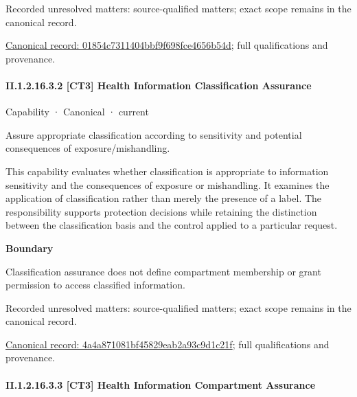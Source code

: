 {\small Recorded unresolved matters: source-qualified matters; exact scope remains in the canonical record.}\par
{\footnotesize \href{../../../../continuum/strategy/capability/01854c7311404bbf9f698fce4656b54d.md}{Canonical record: 01854c7311404bbf9f698fce4656b54d}; full qualifications and provenance.}\par
\paragraph*{II.1.2.16.3.2 [CT3] Health Information Classification Assurance}
\label{navigation:II.1.2.16.3.2}

\label{element:4a4a871081bf45829eab2a93c9d1c21f}
{\small Capability · Canonical · current}\par

Assure appropriate classification according to sensitivity and potential consequences of exposure/mishandling.



This capability evaluates whether classification is appropriate to information sensitivity and the consequences of exposure or mishandling. It examines the application of classification rather than merely the presence of a label. The responsibility supports protection decisions while retaining the distinction between the classification basis and the control applied to a particular request.



\textbf{Boundary}



Classification assurance does not define compartment membership or grant permission to access classified information.


{\small Recorded unresolved matters: source-qualified matters; exact scope remains in the canonical record.}\par
{\footnotesize \href{../../../../continuum/strategy/capability/4a4a871081bf45829eab2a93c9d1c21f.md}{Canonical record: 4a4a871081bf45829eab2a93c9d1c21f}; full qualifications and provenance.}\par
\paragraph*{II.1.2.16.3.3 [CT3] Health Information Compartment Assurance}
\label{navigation:II.1.2.16.3.3}

